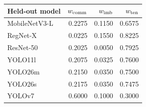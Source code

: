 \begin{tabular}{@{}lrrr@{}}
\toprule
Held-out model & $w_{\rm comm}$ & $w_{\rm imb}$ & $w_{\rm ten}$ \\
\midrule
MobileNetV3-L & 0.2275 & 0.1150 & 0.6575 \\
RegNet-X & 0.0225 & 0.1550 & 0.8225 \\
ResNet-50 & 0.2025 & 0.0050 & 0.7925 \\
YOLO11l & 0.2075 & 0.0325 & 0.7600 \\
YOLO26m & 0.2150 & 0.0350 & 0.7500 \\
YOLO26s & 0.2175 & 0.0350 & 0.7475 \\
YOLOv7 & 0.6000 & 0.1000 & 0.3000 \\
\bottomrule
\end{tabular}
